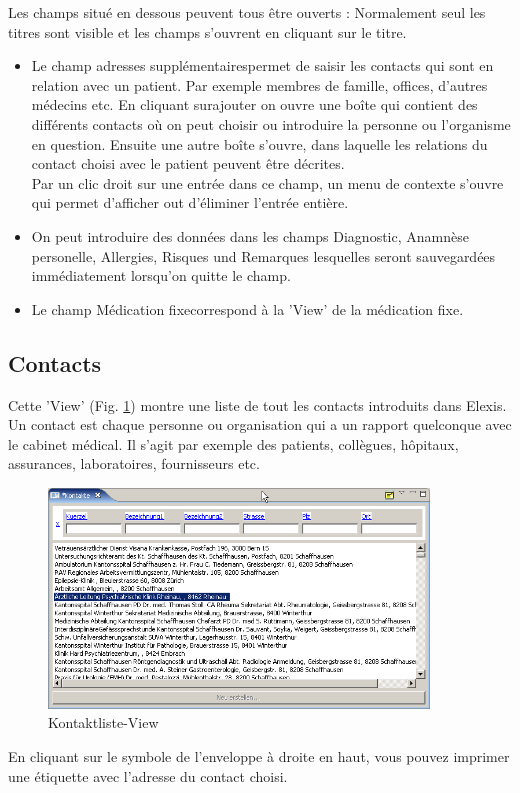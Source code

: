 Les champs situé en dessous peuvent tous être ouverts : Normalement seul les titres sont visible et les champs s'ouvrent en cliquant sur le titre.
\begin{itemize}
  \item Le champ \glqq adresses supplémentaires\grqq{}permet de saisir les contacts qui sont en
relation avec un patient. Par exemple membres de famille, offices, d'autres médecins etc. En cliquant sur\glqq ajouter\grqq{} on ouvre une boîte qui contient des différents contacts où on peut choisir ou introduire la personne ou l'organisme en question. Ensuite une autre boîte s'ouvre, dans laquelle les relations du contact choisi avec le patient peuvent être décrites.\\
  Par un clic droit sur une entrée dans ce champ, un menu de contexte s'ouvre qui permet d'afficher out d'éliminer l'entrée entière.
  \item On peut introduire des données dans les champs \glqq Diagnostic\grqq, \glqq Anamnèse personelle\grqq{},
  \glqq Allergies\grqq{}, \glqq Risques\grqq{} und \glqq Remarques\grqq{} lesquelles seront sauvegardées immédiatement lorsqu'on quitte le champ.
  \item Le champ \glqq Médication fixe\grqq{}correspond à la 'View' de la médication fixe.

\end{itemize}
\subsection{Contacts}
Cette 'View' (Fig. \ref{fig:kontaktlist}) montre une liste de tout les contacts introduits dans Elexis. Un contact est chaque personne ou organisation qui a un rapport quelconque avec le cabinet médical. Il s'agit par exemple des patients, collègues, hôpitaux, assurances, laboratoires, fournisseurs etc. 
\begin{figure}[htp]
\begin{center}
  \includegraphics[width=0.9\textwidth]{images/kontaktlistview}
  \caption{Kontaktliste-View}
  \label{fig:kontaktlist}
\end{center}
\end{figure}
En cliquant sur le symbole de l'enveloppe à droite en haut, vous pouvez imprimer une étiquette avec l'adresse du contact choisi.

